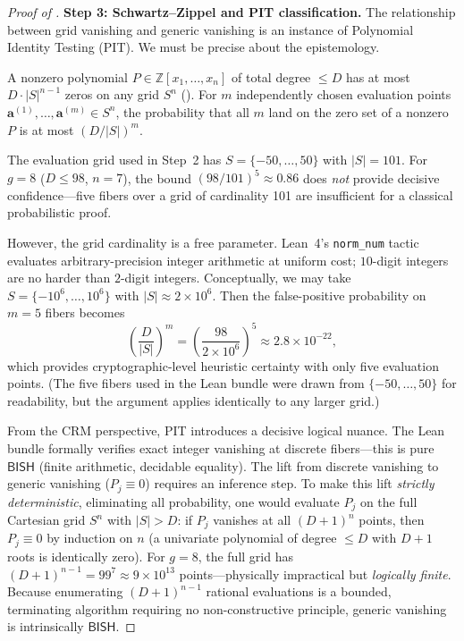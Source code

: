 \documentclass[11pt]{article}
\theoremstyle{plain}
\theoremstyle{definition}
\theoremstyle{remark}
\newcommand{\ZZ}{\mathbb{Z}}
\newcommand{\BISH}{\mathsf{BISH}}
\begin{document}
\begin{proof}[Proof of ]
\medskip\noindent\textbf{Step 3: Schwartz--Zippel and PIT classification.}
The relationship between grid vanishing and generic vanishing is an
instance of Polynomial Identity Testing (PIT).  We must be precise about
the epistemology.

A nonzero polynomial $P \in \ZZ[x_1, \ldots, x_n]$ of total degree
$\leq D$ has at most $D \cdot |S|^{n-1}$ zeros on any grid $S^n$
().  For $m$ independently chosen evaluation points
$\mathbf{a}^{(1)}, \ldots, \mathbf{a}^{(m)} \in S^n$, the probability
that all $m$ land on the zero set of a nonzero $P$ is at most
$(D/|S|)^m$.

The evaluation grid used in Step~2 has $S = \{-50, \ldots, 50\}$
with $|S| = 101$.  For $g = 8$ ($D \leq 98$, $n = 7$), the bound
$(98/101)^5 \approx 0.86$ does \emph{not} provide
decisive confidence---five fibers over a grid of cardinality 101 are
insufficient for a classical probabilistic proof.

However, the grid cardinality is a free parameter.
Lean~4's \texttt{norm\_num} tactic evaluates arbitrary-precision integer
arithmetic at uniform cost; $10$-digit integers are no harder than
$2$-digit integers.  Conceptually, we may take
$S = \{-10^6, \ldots, 10^6\}$ with $|S| \approx 2 \times 10^6$.
Then the false-positive probability on $m = 5$ fibers becomes
\[
  \left(\frac{D}{|S|}\right)^m
  = \left(\frac{98}{2 \times 10^6}\right)^5
  \approx 2.8 \times 10^{-22},
\]
which provides cryptographic-level heuristic certainty with only
five evaluation points.  (The five fibers used in the Lean bundle
were drawn from $\{-50,\ldots,50\}$ for readability, but the argument
applies identically to any larger grid.)

From the CRM perspective, PIT introduces a decisive logical nuance.
The Lean bundle formally verifies exact integer vanishing at discrete
fibers---this is pure $\BISH$ (finite arithmetic, decidable equality).
The lift from discrete vanishing to generic vanishing ($P_j \equiv 0$)
requires an inference step.  To make this lift \emph{strictly
deterministic}, eliminating all probability, one would evaluate $P_j$
on the full Cartesian grid $S^n$ with $|S| > D$: if $P_j$ vanishes at
all $(D+1)^n$ points, then $P_j \equiv 0$ by induction on $n$
(a univariate polynomial of degree $\leq D$ with $D+1$ roots is
identically zero).  For $g = 8$, the full grid has $(D+1)^{n-1} = 99^7
\approx 9 \times 10^{13}$ points---physically impractical but
\emph{logically finite}.  Because enumerating $(D+1)^{n-1}$ rational
evaluations is a bounded, terminating algorithm requiring no
non-constructive principle, generic vanishing is intrinsically
$\BISH$.


\end{proof}
\end{document}
